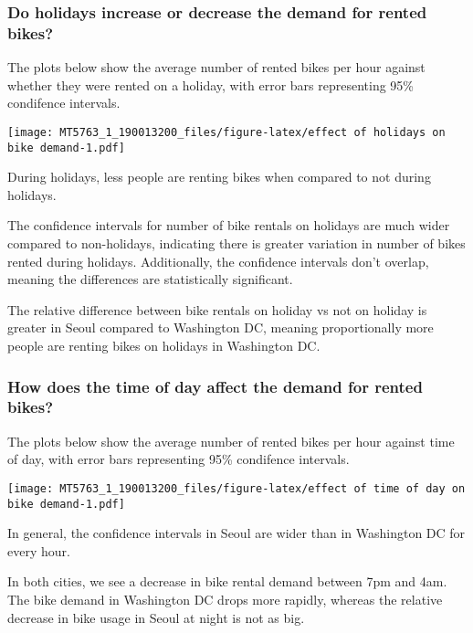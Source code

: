 \documentclass[]{article}
\begin{document}
\hypertarget{do-holidays-increase-or-decrease-the-demand-for-rented-bikes}{%
\subsubsection{Do holidays increase or decrease the demand for rented
bikes?}\label{do-holidays-increase-or-decrease-the-demand-for-rented-bikes}}

The plots below show the average number of rented bikes per hour against
whether they were rented on a holiday, with error bars representing 95\%
condifence intervals.

\texttt{[image: MT5763\_1\_190013200\_files/figure-latex/effect of holidays on bike demand-1.pdf]}

During holidays, less people are renting bikes when compared to not
during holidays.

The confidence intervals for number of bike rentals on holidays are much
wider compared to non-holidays, indicating there is greater variation in
number of bikes rented during holidays. Additionally, the confidence
intervals don't overlap, meaning the differences are statistically
significant.

The relative difference between bike rentals on holiday vs not on
holiday is greater in Seoul compared to Washington DC, meaning
proportionally more people are renting bikes on holidays in Washington
DC.

\hypertarget{how-does-the-time-of-day-affect-the-demand-for-rented-bikes}{%
\subsubsection{How does the time of day affect the demand for rented
bikes?}\label{how-does-the-time-of-day-affect-the-demand-for-rented-bikes}}

The plots below show the average number of rented bikes per hour against
time of day, with error bars representing 95\% condifence intervals.

\texttt{[image: MT5763\_1\_190013200\_files/figure-latex/effect of time of day on bike demand-1.pdf]}

In general, the confidence intervals in Seoul are wider than in
Washington DC for every hour.

In both cities, we see a decrease in bike rental demand between 7pm and
4am. The bike demand in Washington DC drops more rapidly, whereas the
relative decrease in bike usage in Seoul at night is not as big.
\end{document}
